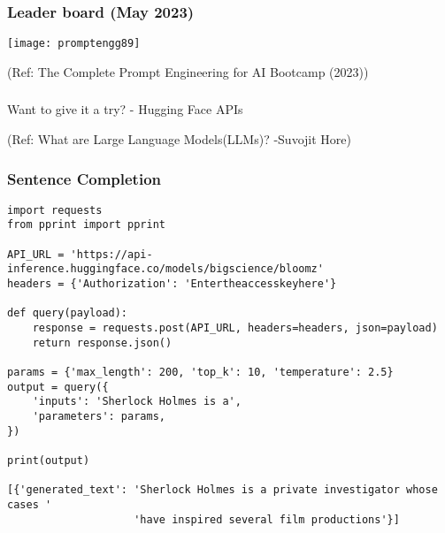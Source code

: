 
\begin{frame}[fragile]\frametitle{Leader board (May 2023)}


		\begin{center}
		\texttt{[image: promptengg89]}

		{\tiny (Ref: The Complete Prompt Engineering for AI Bootcamp (2023))}
		\end{center}	

\end{frame}

\begin{frame}[fragile]\frametitle{}
\begin{center}
{\Large Want to give it a try? - Hugging Face APIs}

  {\tiny (Ref: What are Large Language Models(LLMs)? -Suvojit Hore)}

\end{center}
\end{frame}

\begin{frame}[fragile]\frametitle{Sentence Completion}


\begin{lstlisting}
import requests
from pprint import pprint

API_URL = 'https://api-inference.huggingface.co/models/bigscience/bloomz'
headers = {'Authorization': 'Entertheaccesskeyhere'}

def query(payload):
    response = requests.post(API_URL, headers=headers, json=payload)
    return response.json()
  
params = {'max_length': 200, 'top_k': 10, 'temperature': 2.5}
output = query({
    'inputs': 'Sherlock Holmes is a',
    'parameters': params,
})

print(output)

[{'generated_text': 'Sherlock Holmes is a private investigator whose cases '
                    'have inspired several film productions'}]
\end{lstlisting}

\end{frame}


